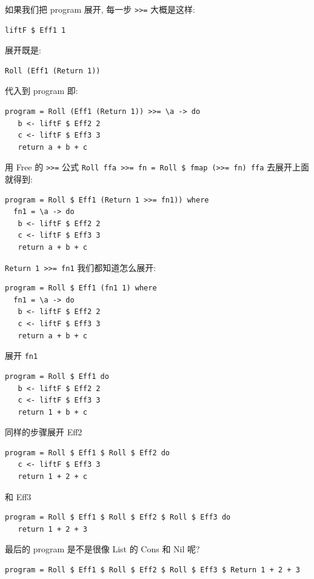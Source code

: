 \documentclass[11pt]{tufte-book}
\begin{document}
如果我们把 program 展开, 每一步 \texttt{>>=} 大概是这样:

\begin{verbatim}
liftF $ Eff1 1
\end{verbatim}

展开既是:

\begin{verbatim}
Roll (Eff1 (Return 1))
\end{verbatim}

代入到 program 即:
\begin{verbatim}
program = Roll (Eff1 (Return 1)) >>= \a -> do
   b <- liftF $ Eff2 2
   c <- liftF $ Eff3 3
   return a + b + c
\end{verbatim}

用 Free 的 \texttt{>>=} 公式 \texttt{Roll ffa >>= fn = Roll \$ fmap (>>= fn) ffa} 去展开上面就得到:

\begin{verbatim}
program = Roll $ Eff1 (Return 1 >>= fn1)) where
  fn1 = \a -> do
   b <- liftF $ Eff2 2
   c <- liftF $ Eff3 3
   return a + b + c
\end{verbatim}

\texttt{Return 1 >>= fn1} 我们都知道怎么展开:

\begin{verbatim}
program = Roll $ Eff1 (fn1 1) where
  fn1 = \a -> do
   b <- liftF $ Eff2 2
   c <- liftF $ Eff3 3
   return a + b + c
\end{verbatim}

展开 \texttt{fn1}

\begin{verbatim}
program = Roll $ Eff1 do
   b <- liftF $ Eff2 2
   c <- liftF $ Eff3 3
   return 1 + b + c
\end{verbatim}


同样的步骤展开 Eff2
\begin{verbatim}
program = Roll $ Eff1 $ Roll $ Eff2 do
   c <- liftF $ Eff3 3
   return 1 + 2 + c
\end{verbatim}

和 Eff3

\begin{verbatim}
program = Roll $ Eff1 $ Roll $ Eff2 $ Roll $ Eff3 do
   return 1 + 2 + 3
\end{verbatim}

最后的 program 是不是很像 List 的 Cons 和 Nil 呢?

\begin{verbatim}
program = Roll $ Eff1 $ Roll $ Eff2 $ Roll $ Eff3 $ Return 1 + 2 + 3
\end{verbatim}
\end{document}
